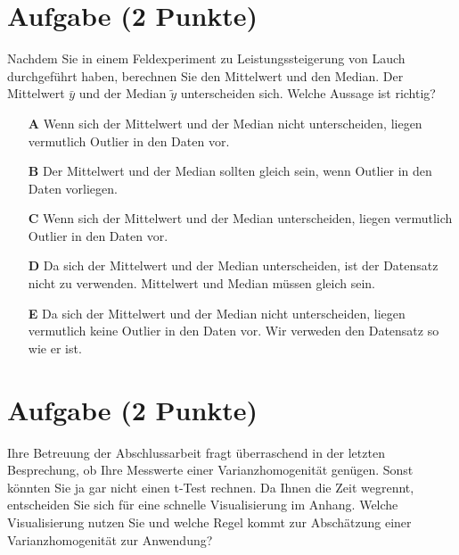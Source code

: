 \documentclass[a4paper, 9pt]{scrartcl}\usepackage[]{graphicx}\usepackage[]{xcolor}
\begin{document}
\section{Aufgabe \hfill (2 Punkte)}



Nachdem Sie in einem Feldexperiment zu Leistungssteigerung von Lauch durchgeführt haben, berechnen Sie den Mittelwert und den Median. Der Mittelwert $\bar{y}$ und der Median $\tilde{y}$ unterscheiden sich. Welche Aussage ist richtig?



\begin{enumerate}
\item [\textbf{A} \msquare] Wenn sich der Mittelwert und der Median nicht unterscheiden, liegen vermutlich Outlier in den Daten vor.
\item [\textbf{B} \msquare] Der Mittelwert und der Median sollten gleich sein, wenn Outlier in den Daten vorliegen. 
\item [\textbf{C} \msquare] Wenn sich der Mittelwert und der Median unterscheiden, liegen vermutlich Outlier in den Daten vor.
\item [\textbf{D} \msquare] Da sich der Mittelwert und der Median unterscheiden, ist der Datensatz nicht zu verwenden. Mittelwert und Median müssen gleich sein.
\item [\textbf{E} \msquare] Da sich der Mittelwert und der Median nicht unterscheiden, liegen vermutlich keine Outlier in den Daten vor. Wir verweden den Datensatz so wie er ist.
\end{enumerate}

\section{Aufgabe \hfill (2 Punkte)}



Ihre Betreuung der Abschlussarbeit fragt überraschend in der letzten Besprechung, ob Ihre Messwerte einer Varianzhomogenität genügen. Sonst könnten Sie ja gar nicht einen t-Test rechnen. Da Ihnen die Zeit wegrennt, entscheiden Sie sich für eine schnelle Visualisierung im Anhang. Welche Visualisierung nutzen Sie und welche Regel kommt zur Abschätzung einer Varianzhomogenität zur Anwendung?
\end{document}
